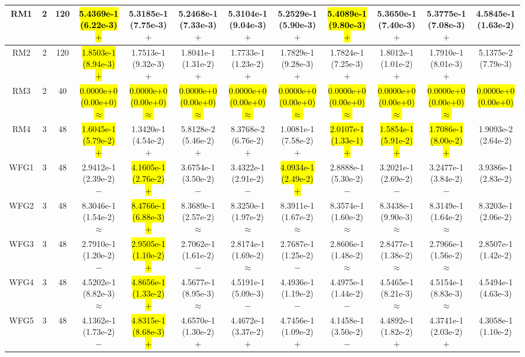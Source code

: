 \documentclass[journal]{IEEEtran}
\begin{document}
\begin{table*}[htbp]
\begin{tabular}{cccccccccccc}
\hline
\multirow{1}{*}{RM1}&2&120&\hl{5.4369e-1 (6.22e-3) $+$}&5.3185e-1 (7.75e-3) $+$&5.2468e-1 (7.33e-3) $+$&5.3104e-1 (9.04e-3) $+$&5.2529e-1 (5.90e-3) $+$&\hl{5.4089e-1 (9.80e-3) $+$}&5.3650e-1 (7.40e-3) $+$&5.3775e-1 (7.08e-3) $+$&4.5845e-1 (1.63e-2)\\
\hline
\multirow{1}{*}{RM2}&2&120&\hl{1.8503e-1 (8.94e-3) $+$}&1.7513e-1 (9.32e-3) $+$&1.8041e-1 (1.31e-2) $+$&1.7733e-1 (1.23e-2) $+$&1.7829e-1 (9.28e-3) $+$&1.7824e-1 (7.25e-3) $+$&1.8012e-1 (1.01e-2) $+$&1.7910e-1 (8.01e-3) $+$&5.1375e-2 (7.79e-3)\\
\hline
\multirow{1}{*}{RM3}&2&40&\hl{0.0000e+0 (0.00e+0) $\approx$}&\hl{0.0000e+0 (0.00e+0) $\approx$}&\hl{0.0000e+0 (0.00e+0) $\approx$}&\hl{0.0000e+0 (0.00e+0) $\approx$}&\hl{0.0000e+0 (0.00e+0) $\approx$}&\hl{0.0000e+0 (0.00e+0) $\approx$}&\hl{0.0000e+0 (0.00e+0) $\approx$}&\hl{0.0000e+0 (0.00e+0) $\approx$}&\hl{0.0000e+0 (0.00e+0)}\\
\hline
\multirow{1}{*}{RM4}&3&48&\hl{1.6045e-1 (5.79e-2) $+$}&1.3420e-1 (4.54e-2) $+$&5.8128e-2 (5.46e-2) $+$&8.3768e-2 (6.76e-2) $+$&1.0081e-1 (7.58e-2) $+$&\hl{2.0107e-1 (1.33e-1) $+$}&\hl{1.5854e-1 (5.91e-2) $+$}&\hl{1.7086e-1 (8.00e-2) $+$}&1.9093e-2 (2.64e-2)\\
\hline
\multirow{1}{*}{WFG1}&3&48&2.9412e-1 (2.39e-2) $-$&\hl{4.1605e-1 (2.76e-2) $+$}&3.6754e-1 (3.50e-2) $-$&3.4322e-1 (2.91e-2) $-$&\hl{4.0934e-1 (2.49e-2) $+$}&2.8888e-1 (5.30e-2) $-$&3.2021e-1 (2.69e-2) $-$&3.2477e-1 (3.84e-2) $-$&3.9386e-1 (2.83e-2)\\
\hline
\multirow{1}{*}{WFG2}&3&48&8.3046e-1 (1.54e-2) $\approx$&\hl{8.4766e-1 (6.88e-3) $+$}&8.3689e-1 (2.57e-2) $\approx$&8.3250e-1 (1.97e-2) $\approx$&8.3911e-1 (1.67e-2) $\approx$&8.3574e-1 (1.60e-2) $\approx$&8.3438e-1 (9.90e-3) $\approx$&8.3149e-1 (1.64e-2) $\approx$&8.3203e-1 (2.06e-2)\\
\hline
\multirow{1}{*}{WFG3}&3&48&2.7910e-1 (1.20e-2) $-$&\hl{2.9505e-1 (1.10e-2) $+$}&2.7062e-1 (1.61e-2) $-$&2.8174e-1 (1.69e-2) $\approx$&2.7687e-1 (1.25e-2) $-$&2.8606e-1 (1.48e-2) $\approx$&2.8477e-1 (1.38e-2) $\approx$&2.7966e-1 (1.56e-2) $\approx$&2.8507e-1 (1.42e-2)\\
\hline
\multirow{1}{*}{WFG4}&3&48&4.5202e-1 (8.82e-3) $\approx$&\hl{4.8656e-1 (1.33e-2) $+$}&4.5677e-1 (8.95e-3) $\approx$&4.5191e-1 (5.09e-3) $-$&4.4936e-1 (1.19e-2) $-$&4.4975e-1 (1.44e-2) $-$&4.5465e-1 (8.21e-3) $\approx$&4.5154e-1 (8.83e-3) $\approx$&4.5494e-1 (4.63e-3)\\
\hline
\multirow{1}{*}{WFG5}&3&48&4.1362e-1 (1.73e-2) $-$&\hl{4.8315e-1 (8.68e-3) $+$}&4.6570e-1 (1.30e-2) $+$&4.4672e-1 (3.37e-2) $+$&4.7456e-1 (1.09e-2) $+$&4.1458e-1 (3.50e-2) $-$&4.4892e-1 (1.82e-2) $+$&4.3741e-1 (2.03e-2) $+$&4.3058e-1 (1.10e-2)\\

\end{tabular}
\end{table*}
\end{document}
